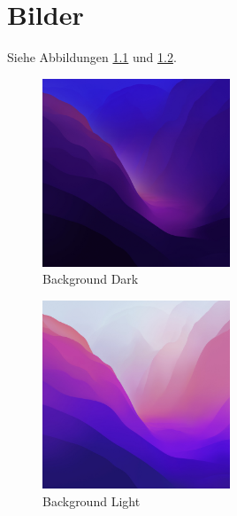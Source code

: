 \documentclass[a4paper, 12pt, notitlepage]{report}
\begin{document}
    \chapter{Bilder}

    Siehe Abbildungen \ref{fig:bg-dark} und \ref{fig:bg-light}.

    \begin{figure}[tp!]
        \centering
        \includegraphics[width=0.5\textwidth]{fig/12-Dark.jpg}
        \caption{Background Dark}
        \label{fig:bg-dark}
    \end{figure}

    \begin{figure}[tp!]
        \centering
        \includegraphics[width=0.5\textwidth]{fig/12-Light.jpg}
        \caption{Background Light}
        \label{fig:bg-light}
    \end{figure}
\end{document}
